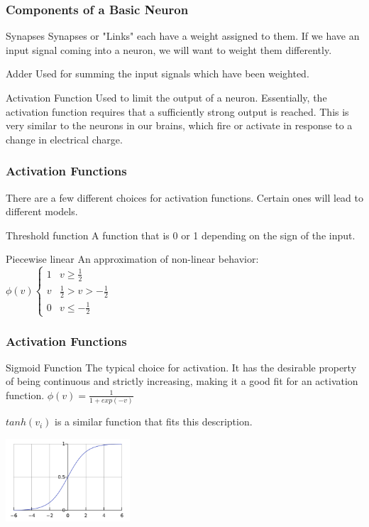 \documentclass{beamer}
\begin{document}
\begin{frame}
\frametitle{Components of a Basic Neuron}
\begin{block}{Synapses}
Synapses or "Links"  each have a weight assigned to them. If we have an input signal coming into a neuron, we will want to weight them differently.
\end{block}
\begin{block}{Adder}
Used for summing the input signals which have been weighted. 
\end{block}

\begin{block}{Activation Function}
Used to limit the output of a neuron. Essentially, the activation function  requires that a sufficiently strong output is reached. This is very similar to the neurons in our brains, which fire or activate in response to a change in electrical charge.
\end{block}

\end{frame}

\begin{frame}
\frametitle{Activation Functions}
There are a few different choices for activation functions. Certain ones will lead to different models. 
\begin{block}{Threshold function}
A function that is 0 or 1 depending on the sign of the input. 
\end{block}
\begin{block}{Piecewise linear}
An approximation of non-linear behavior:
$
   \phi(v) \left\{
     \begin{array}{ll}
       1 &  v \geq \frac{1}{2}\\
       v & \frac{1}{2}>v>-\frac{1}{2}\\
       0 &  v \leq -\frac{1}{2}\
     \end{array}
   \right.
$
\end{block}
\end{frame}


\begin{frame}
\frametitle{Activation Functions}
\begin{block}{Sigmoid Function}
The typical choice for activation. It has the desirable property of being continuous and strictly increasing, making it a good fit for an activation function. 
$\phi(v) = \frac{1}{1+exp(-v)}$

$tanh(v_i)$ is a similar function that fits this description.
\end{block}
\includegraphics[width = 175px]{sig.png}
\end{frame}
\end{document}
